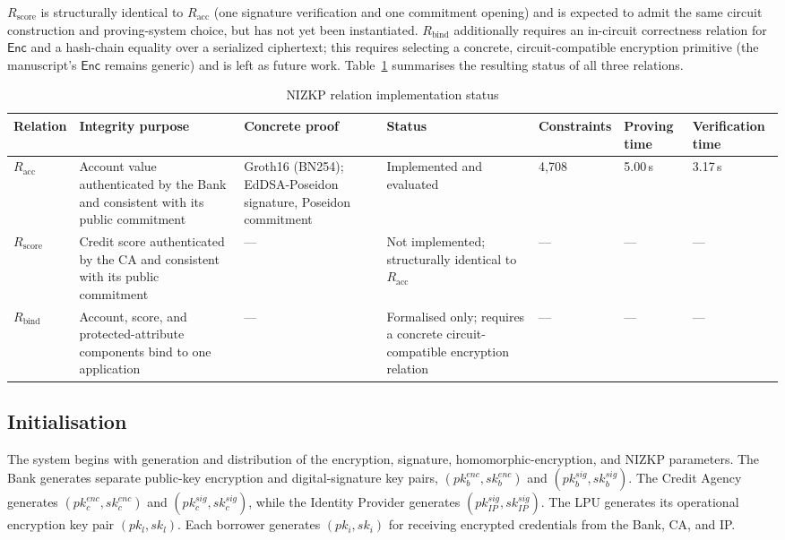 \documentclass[a4paper,fleqn]{cas-dc}
\begin{document}
{$R_{\mathrm{score}}$ is structurally identical to $R_{\mathrm{acc}}$ (one signature verification and one commitment opening) and is expected to admit the same circuit construction and proving-system choice, but has not yet been instantiated. $R_{\mathrm{bind}}$ additionally requires an in-circuit correctness relation for $\mathsf{Enc}$ and a hash-chain equality over a serialized ciphertext; this requires selecting a concrete, circuit-compatible encryption primitive (the manuscript's $\mathsf{Enc}$ remains generic) and is left as future work. Table~\ref{tab:nizkp_status} summarises the resulting status of all three relations.

\begin{table}[htbp]
\centering
\caption{NIZKP relation implementation status}
\label{tab:nizkp_status}
\scriptsize
\begin{tabular}{|p{1.6cm}|p{3.6cm}|p{2.6cm}|p{2.6cm}|p{1.6cm}|p{1.5cm}|p{1.5cm}|}
\hline
\textbf{Relation} & \textbf{Integrity purpose} & \textbf{Concrete proof} & \textbf{Status} & \textbf{Constraints} & \textbf{Proving time} & \textbf{Verification time} \\
\hline
$R_{\mathrm{acc}}$ & Account value authenticated by the Bank and consistent with its public commitment & Groth16 (BN254); EdDSA-Poseidon signature, Poseidon commitment & Implemented and evaluated & 4{,}708 & 5.00\,s & 3.17\,s \\
\hline
$R_{\mathrm{score}}$ & Credit score authenticated by the CA and consistent with its public commitment & --- & Not implemented; structurally identical to $R_{\mathrm{acc}}$ & --- & --- & --- \\
\hline
$R_{\mathrm{bind}}$ & Account, score, and protected-attribute components bind to one application & --- & Formalised only; requires a concrete circuit-compatible encryption relation & --- & --- & --- \\
\hline
\end{tabular}
\end{table}
}

\subsection{Initialisation}
\label{subsec:init}
The system begins with generation and distribution of the encryption,
signature, homomorphic-encryption, and NIZKP parameters. The Bank generates
separate public-key encryption and digital-signature key pairs,
$(pk_b^{enc},sk_b^{enc})$ and $(pk_b^{sig},sk_b^{sig})$. The Credit Agency
generates $(pk_c^{enc},sk_c^{enc})$ and $(pk_c^{sig},sk_c^{sig})$, while the
Identity Provider generates $(pk_{IP}^{sig},sk_{IP}^{sig})$. The LPU generates
its operational encryption key pair $(pk_l,sk_l)$. Each borrower generates
$(pk_i,sk_i)$ for receiving encrypted credentials from the Bank, CA, and IP.
\end{document}
